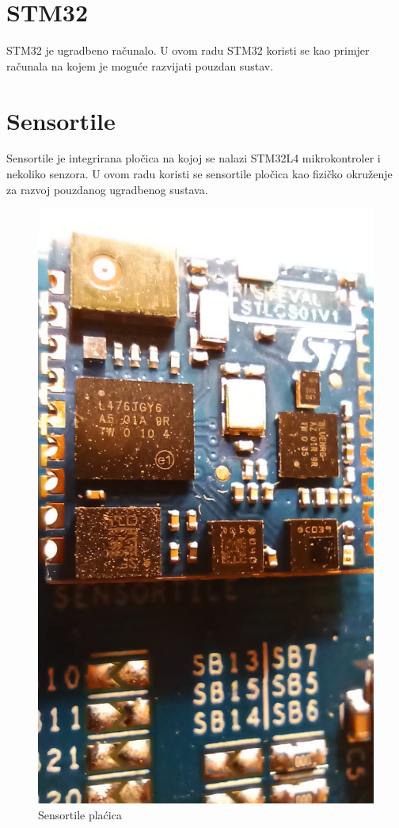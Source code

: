 \documentclass[times, utf8, diplomski]{diplomski}
\begin{document}
\section{STM32}
STM32 \cite{STM32L476JG} je ugradbeno računalo. U ovom radu STM32 koristi se kao primjer računala na kojem je moguće razvijati pouzdan sustav.

\section{Sensortile}
Sensortile \cite{sensortile} je integrirana pločica na kojoj se nalazi STM32L4 mikrokontroler i nekoliko senzora. U ovom radu koristi se sensortile pločica kao fizičko okruženje za razvoj pouzdanog ugradbenog sustava.
 
\begin{figure}[H]
\includegraphics[scale=0.14]{tile_close.jpeg}
\centering
\caption{Sensortile plaćica}
\end{figure}
\end{document}
